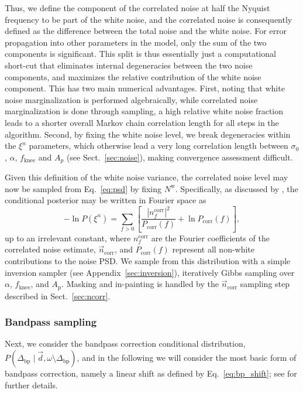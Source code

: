 \documentclass[onecolumn]{aa}
\renewcommand{\d}[0]{\vec{d}}
\newcommand{\n}[0]{\vec{n}}
\begin{document}
Thus, we define the component of the correlated noise at half the
Nyquist frequency to be part of the white noise, and the correlated
noise is consequently defined as the difference between the total
noise and the white noise. For error propagation into other parameters
in the model, only the sum of the two components is significant. This
split is thus essentially just a computational short-cut that
eliminates internal degeneracies between the two noise components, and
maximizes the relative contribution of the white noise component. This
has two main numerical advantages. First, noting that white noise
marginalization is performed algebraically, while correlated noise
marginalization is done through sampling, a high relative white noise
fraction leads to a shorter overall Markov chain correlation length
for all steps in the algorithm. Second, by fixing the white noise
level, we break degeneracies within the $\xi^{n}$ parameters, which
otherwise lead a very long correlation length between $\sigma_0$,
$\alpha$, $f_{\mathrm{knee}}$ and $A_p$ (see Sect.~\ref{sec:noise}),
making convergence assessment difficult.

Given this definition of the white noise variance, the correlated
noise level may now be sampled from Eq.~\eqref{eq:psd} by fixing
$N^{\mathrm{w}}$. Specifically, as discussed by \citet{bp06}, the
conditional posterior may be written in Fourier space as
\begin{equation}
  -\ln P(\xi^n) = \sum_{f>0}
  \left[\frac{|n_f^\mathrm{corr}|^2}{P_{\mathrm{corr}}(f)}
    + \ln{P_{\mathrm{corr}}(f)}\right],
  \label{eq:logP_S}
\end{equation}
up to an irrelevant constant, where $n_f^\mathrm{corr}$ are the
Fourier coefficients of the correlated noise estimate,
$\n_{\mathrm{corr}}$, and $P_{\mathrm{corr}}(f)$ represent all
non-white contributions to the noise PSD. We sample from this
distribution with a simple inversion sampler (see
Appendix~\ref{sec:inversion}), iteratively Gibbs sampling over
$\alpha$, $f_{\mathrm{knee}}$, and $A_\mathrm{p}$. Masking and
in-painting is handled by the $\n_{\mathrm{corr}}$ sampling step
described in Sect.~\ref{sec:ncorr}.

\subsubsection{Bandpass sampling}
\label{sec:bp}  

Next, we consider the bandpass correction conditional distribution,
$P(\Delta_{\mathrm{bp}}\mid \d,\omega\setminus\Delta_{\mathrm{bp}})$,
and in the following we will consider the most basic form of bandpass
correction, namely a linear shift as defined by
Eq.~\eqref{eq:bp_shift}; see \citet{bp09} for further details.
\end{document}
